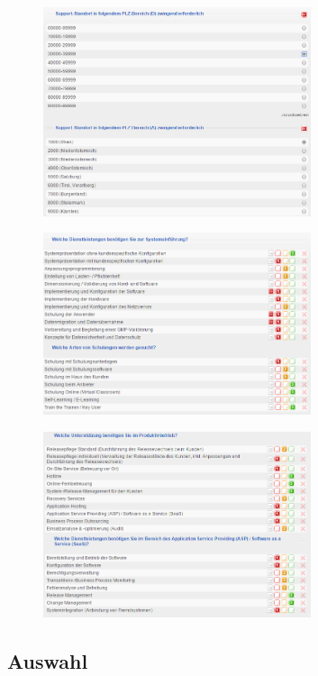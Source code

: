 \documentclass[12pt]{article}
\begin{document}
\begin{figure}[here!]
\centering
\includegraphics[width=0.7\textwidth]{images/tr53}
\end{figure}\FloatBarrier
\noindent
\begin{figure}[here!]
\centering
\includegraphics[width=0.7\textwidth]{images/tr54}
\end{figure}\FloatBarrier
\noindent
\begin{figure}[here!]
\centering
\includegraphics[width=0.7\textwidth]{images/tr55}
\end{figure}\FloatBarrier
\noindent
\subsection{Auswahl}
\end{document}
